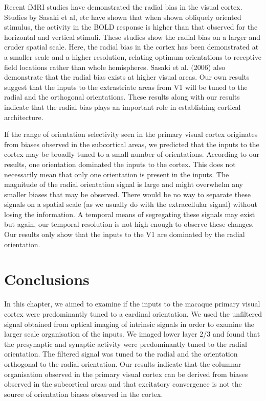 	
		Recent fMRI studies have demonstrated the radial bias in the visual cortex. Studies by Sasaki et al, etc have shown that when shown obliquely oriented stimulus, the activity in the BOLD response is higher than that observed for the horizontal and vertical stimuli. These studies show the radial bias on a larger and cruder spatial scale. Here, the radial bias in the cortex has been demonstrated at a smaller scale and a higher resolution, relating optimum orientations to receptive field locations rather than whole hemispheres. Sasaki et al. (2006) also demonstrate that the radial bias exists at higher visual areas. Our own results suggest that the inputs to the extrastriate areas from V1 will be tuned to the radial and the orthogonal orientations. These results along with our results indicate that the radial bias plays an important role in establishing cortical architecture.
		
		If the range of orientation selectivity seen in the primary visual cortex originates from biases observed in the subcortical areas, we predicted that the inputs to the cortex may be broadly tuned to a small number of orientations. According to our results, one orientation dominated the inputs to the cortex. This does not necessarily mean that only one orientation is present in the inputs. The magnitude of the radial orientation signal is large and might overwhelm any smaller biases that may be observed. There would be no way to separate these signals on a spatial scale (as we usually do with the extracellular signal) without losing the information. A temporal means of segregating these signals may exist but again, our temporal resolution is not high enough to observe these changes. Our results only show that the inputs to the V1 are dominated by the radial orientation.
		 
	\pagebreak
	\section{Conclusions}
	
		In this chapter, we aimed to examine if the inputs to the macaque primary visual cortex were predominantly tuned to a cardinal orientation. We used the unfiltered signal obtained from optical imaging of intrinsic signals in order to examine the larger scale organisation of the inputs. We imaged lower layer 2/3 and found that the presynaptic and synaptic activity were predominantly tuned to the radial orientation. The filtered signal was tuned to the radial and the orientation orthogonal to the radial orientation. Our results indicate that the columnar organisation observed in the primary visual cortex can be derived from biases observed in the subcortical areas and that excitatory convergence is not the source of orientation biases observed in the cortex.
		